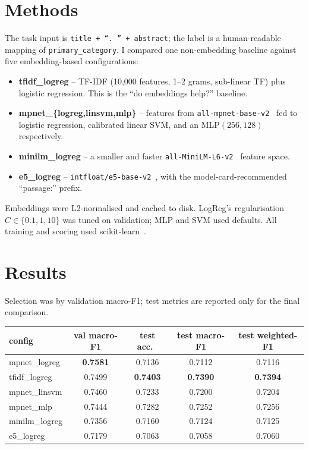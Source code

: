 \documentclass[10pt]{article}
\begin{document}
\section{Methods}
The task input is \texttt{title + ``. '' + abstract}; the label is a
human-readable mapping of \texttt{primary\_category}. I compared one
non-embedding baseline against five embedding-based configurations:
\begin{itemize}
\item \textbf{tfidf\_logreg} -- TF-IDF (10{,}000 features, 1--2 grams, sub-linear
  TF) plus logistic regression. This is the ``do embeddings help?'' baseline.
\item \textbf{mpnet\_\{logreg,linsvm,mlp\}} -- features from
  \texttt{all-mpnet-base-v2}~\cite{song2020mpnet,reimers2019sbert} fed to
  logistic regression, calibrated linear SVM, and an MLP$(256,128)$ respectively.
\item \textbf{minilm\_logreg} -- a smaller and faster
  \texttt{all-MiniLM-L6-v2}~\cite{wang2020minilm} feature space.
\item \textbf{e5\_logreg} -- \texttt{intfloat/e5-base-v2}~\cite{wang2022e5},
  with the model-card-recommended ``passage:'' prefix.
\end{itemize}
Embeddings were L2-normalised and cached to disk. LogReg's regularisation
$C\in\{0.1,1,10\}$ was tuned on validation; MLP and SVM used defaults. All
training and scoring used scikit-learn~\cite{pedregosa2011sklearn}.

\section{Results}
Selection was by validation macro-F1; test metrics are reported only for the
final comparison.

\begin{table}[h!]
\centering
\footnotesize
\begin{tabular}{lcccc}
\toprule
config & val macro-F1 & test acc.\ & test macro-F1 & test weighted-F1 \\
\midrule
mpnet\_logreg  & \textbf{0.7581} & 0.7136 & 0.7112 & 0.7116 \\
tfidf\_logreg  & 0.7499 & \textbf{0.7403} & \textbf{0.7390} & \textbf{0.7394} \\
mpnet\_linsvm  & 0.7460 & 0.7233 & 0.7200 & 0.7204 \\
mpnet\_mlp     & 0.7444 & 0.7282 & 0.7252 & 0.7256 \\
minilm\_logreg & 0.7356 & 0.7160 & 0.7124 & 0.7125 \\
e5\_logreg     & 0.7179 & 0.7063 & 0.7058 & 0.7060 \\
\bottomrule
\end{tabular}
\end{table}
\end{document}
